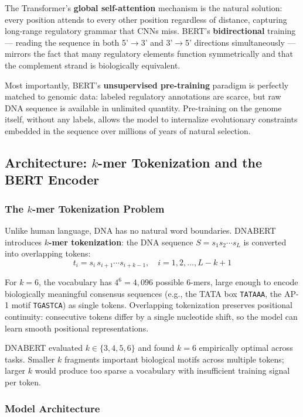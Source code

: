 ﻿\documentclass[12pt,a4paper]{article}
\begin{document}
The Transformer's \textbf{global self-attention} mechanism is the natural solution: every position attends to every other position regardless of distance, capturing long-range regulatory grammar that CNNs miss. BERT's \textbf{bidirectional} training --- reading the sequence in both 5'$\to$3' and 3'$\to$5' directions simultaneously --- mirrors the fact that many regulatory elements function symmetrically and that the complement strand is biologically equivalent.

Most importantly, BERT's \textbf{unsupervised pre-training} paradigm is perfectly matched to genomic data: labeled regulatory annotations are scarce, but raw DNA sequence is available in unlimited quantity. Pre-training on the genome itself, without any labels, allows the model to internalize evolutionary constraints embedded in the sequence over millions of years of natural selection.

\subsection{Architecture: $k$-mer Tokenization and the BERT Encoder}

\subsubsection{The $k$-mer Tokenization Problem}

Unlike human language, DNA has no natural word boundaries. DNABERT introduces \textbf{$k$-mer tokenization}: the DNA sequence $S = s_1 s_2 \cdots s_L$ is converted into overlapping tokens:
$$t_i = s_i \, s_{i+1} \cdots s_{i+k-1}, \quad i = 1, 2, \ldots, L-k+1$$

For $k=6$, the vocabulary has $4^6 = 4{,}096$ possible 6-mers, large enough to encode biologically meaningful consensus sequences (e.g., the TATA box \texttt{TATAAA}, the AP-1 motif \texttt{TGASTCA}) as single tokens. Overlapping tokenization preserves positional continuity: consecutive tokens differ by a single nucleotide shift, so the model can learn smooth positional representations.

DNABERT evaluated $k \in \{3, 4, 5, 6\}$ and found $k=6$ empirically optimal across tasks. Smaller $k$ fragments important biological motifs across multiple tokens; larger $k$ would produce too sparse a vocabulary with insufficient training signal per token.

\subsubsection{Model Architecture}
\end{document}
